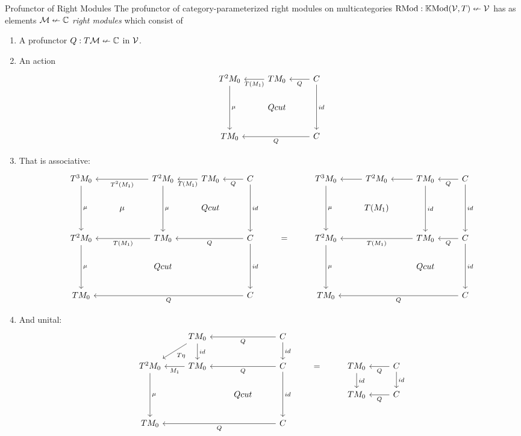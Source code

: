 \documentclass{article}
\begin{document}
\begin{definition}{Profunctor of Right Modules}
  The profunctor of category-parameterized right modules on
  multicategories $\text{RMod} : \mathbb{K}\text{Mod}(\mathcal{V},T) \nleftarrow \mathcal V$ has as elements
  $\mathcal M \nleftarrow \mathbb C$ \emph{right modules} which consist of
  \begin{enumerate}
  \item A profunctor $Q : T \mathcal M \nleftarrow \mathbb C$ in $\mathcal V$.
  \item An action
    \[
\begin{tikzcd}
T^2M_0 \arrow[dd, "\mu"] & T M_0 \arrow[l, "T(M_1)"] & C \arrow[dd, "id"] \arrow[l, "Q"] \\
 & Qcut &  \\
TM_0 &  & C \arrow[ll, "Q"]
\end{tikzcd}
\]
  \item That is associative:
    \[
    \begin{tikzcd}
T^3M_0 \arrow[dd, "\mu"] &  & T^2M_0 \arrow[dd, "\mu"] \arrow[ll, "T^2(M_1)"] & T M_0 \arrow[l, "T(M_1)"] & C \arrow[dd, "id"] \arrow[l, "Q"] &  & T^3M_0 \arrow[dd, "\mu"] & T^2M_0 \arrow[l] & TM_0 \arrow[l] \arrow[dd, "id"] & C \arrow[l, "Q"] \arrow[dd, "id"] \\
 & \mu &  & Qcut &  &  &  & T(M_1) &  &  \\
T^2M_0 \arrow[dd, "\mu"] &  & TM_0 \arrow[ll, "T(M_1)"] &  & C \arrow[ll, "Q"] \arrow[dd, "id"] & = & T^2M_0 \arrow[dd, "\mu"] &  & TM_0 \arrow[ll, "T(M_1)"] & C \arrow[l, "Q"] \arrow[dd, "id"] \\
 &  & Qcut &  &  &  &  &  & Qcut &  \\
TM_0 &  &  &  & C \arrow[llll, "Q"] &  & TM_0 &  &  & C \arrow[lll, "Q"]
\end{tikzcd}
    \]
  \item And unital:
    \[\begin{tikzcd}
 & TM_0 \arrow[ld, "T\eta"] \arrow[d, "id"] &  & C \arrow[ll, "Q"] \arrow[d, "id"] &  &  &  \\
T^2M_0 \arrow[dd, "\mu"] & TM_0 \arrow[l, "M_1"] &  & C \arrow[ll, "Q"] \arrow[dd, "id"] & = & TM_0 \arrow[d, "id"] & C \arrow[d, "id"] \arrow[l, "Q"] \\
 &  & Qcut &  &  & TM_0 & C \arrow[l, "Q"] \\
TM_0 &  &  & C \arrow[lll, "Q"] &  &  & 
    \end{tikzcd}\]
  \end{enumerate}


\end{definition}
\end{document}
